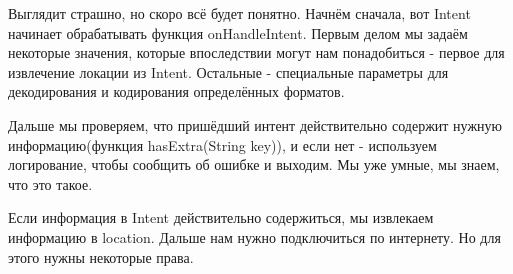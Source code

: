 \documentclass[12 pt]{article}
\begin{document}
    Выглядит страшно, но скоро всё будет понятно. Начнём сначала, вот Intent начинает обрабатывать функция onHandleIntent. Первым делом мы задаём некоторые значения, которые впоследствии могут нам понадобиться - первое для извлечение локации из Intent. Остальные - специальные параметры для декодирования и кодирования определённых форматов.
    
    Дальше мы проверяем, что пришёдший интент действительно содержит нужную информацию(функция hasExtra(String key)), и если нет - используем логирование, чтобы сообщить об ошибке и выходим. Мы уже умные, мы знаем, что это такое. 
    
    Если информация в Intent действительно содержиться, мы извлекаем информацию в location. Дальше нам нужно подключиться по интернету. Но для этого нужны некоторые права.
    
\end{document}
